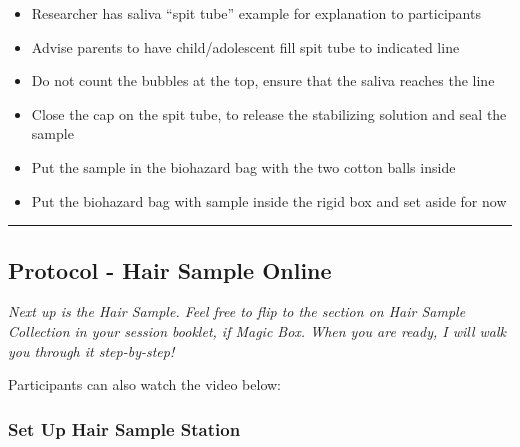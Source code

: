 \documentclass[]{book}
\providecommand{\tightlist}{%
  \setlength{\itemsep}{0pt}\setlength{\parskip}{0pt}}
\begin{document}
\begin{itemize}
\tightlist
\item
  Researcher has saliva ``spit tube'' example for explanation to participants
\item
  Advise parents to have child/adolescent fill spit tube to indicated line
\item
  Do not count the bubbles at the top, ensure that the saliva reaches the line
\item
  Close the cap on the spit tube, to release the stabilizing solution and seal the sample
\item
  Put the sample in the biohazard bag with the two cotton balls inside
\item
  Put the biohazard bag with sample inside the rigid box and set aside for now
\end{itemize}

\begin{center}\rule{0.5\linewidth}{0.5pt}\end{center}

\hypertarget{protocol---hair-sample-online}{%
\subsection{Protocol - Hair Sample Online}\label{protocol---hair-sample-online}}

\emph{Next up is the Hair Sample. Feel free to flip to the section on Hair Sample Collection in your session booklet, if Magic Box. When you are ready, I will walk you through it step-by-step!}

Participants can also watch the video below:

\hypertarget{set-up-hair-sample-station-1}{%
\subsubsection{Set Up Hair Sample Station}\label{set-up-hair-sample-station-1}}
\end{document}
